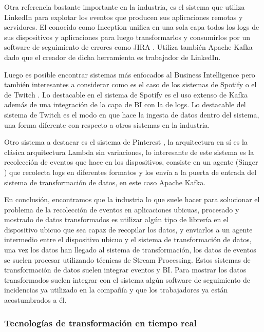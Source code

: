 Otra referencia bastante importante en la industria, es el sistema que utiliza LinkedIn para explotar los eventos que producen sus aplicaciones remotas y servidores. El conocido como Inception \cite{Tfg:inception} unifica en una sola capa todos los logs de sus dispositivos y aplicaciones para luego transformarlos y consumirlos por un software de seguimiento de errores como JIRA \cite{Tfg:jira}. Utiliza también Apache Kafka dado que el creador de dicha herramienta es trabajador de LinkedIn.

Luego es posible encontrar sistemas más enfocados al Business Intelligence pero también interesantes a considerar como es el caso de los sistemas de Spotify  o el de Twitch \cite{Tfg:twitch}. Lo destacable en el sistema de Spotify \cite{Tfg:spotify} es el uso extenso de Kafka además de una integración de la capa de BI con la de logs. Lo destacable del sistema de Twitch es el modo en que hace la ingesta de datos dentro del sistema, una forma diferente con respecto a otros sistemas en la industria.

Otro sistema a destacar es el sistema de Pinterest \cite{Tfg:pinterest}, la arquitectura en sí es la clásica arquitectura Lambda sin variaciones, lo interesante de este sistema es la recolección de eventos que hace en los dispositivos, consiste en un agente (Singer \cite{Tfg:singer}) que recolecta logs en diferentes formatos y los envía a la puerta de entrada del sistema de transformación de datos, en este caso Apache Kafka.

En conclusión, encontramos que la industria lo que suele hacer para solucionar el problema de la recolección de eventos en aplicaciones ubicuas, procesado y mostrado de datos transformados es utilizar algún tipo de librería en el dispositivo ubicuo que sea capaz de recopilar los datos, y enviarlos a un agente intermedio entre el dispositivo ubicuo y el sistema de transformación de datos, una vez los datos han llegado al sistema de transformación, los datos de eventos se suelen procesar utilizando técnicas de Stream Processing. Estos sistemas de transformación de datos suelen integrar eventos y BI. Para mostrar los datos transformados suelen integrar con el sistema algún software de seguimiento de incidencias ya utilizado en la compañía y que los trabajadores ya están acostumbrados a él.

\subsubsection{Tecnologías de transformación en tiempo real}

